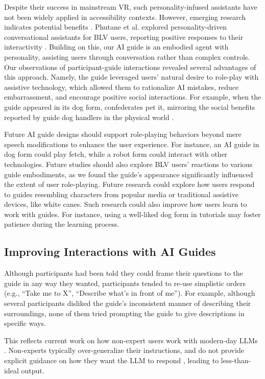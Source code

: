 Despite their success in mainstream VR, such personality-infused assistants have not been widely applied in accessibility contexts. However, emerging research indicates potential benefits \cite{phutane2023speaking}. Phutane et al. explored personality-driven conversational assistants for BLV users, reporting positive responses to their interactivity \cite{phutane2023speaking}. Building on this, our AI guide is an embodied agent with personality, assisting users through conversation rather than complex controls. Our observations of participant-guide interactions revealed several advantages of this approach. Namely, the guide leveraged users’ natural desire to role-play with assistive technology, which allowed them to rationalize AI mistakes, reduce embarrassment, and encourage positive social interactions. For example, when the guide appeared in its dog form, confederates pet it, mirroring the social benefits reported by guide dog handlers in the physical world \cite{hwang2024towards}.

Future AI guide designs should support role-playing behaviors beyond mere speech modifications to enhance the user experience. For instance, an AI guide in dog form could play fetch, while a robot form could interact with other technologies. Future studies should also explore BLV users' reactions to various guide embodiments, as we found the guide's appearance significantly influenced the extent of user role-playing. Future research could explore how users respond to guides resembling characters from popular media or traditional assistive devices, like white canes. Such research could also improve how users learn to work with guides. For instance, using a well-liked dog form in tutorials may foster patience during the learning process.

\subsection{Improving Interactions with AI Guides} \label{sec: Improving Interactions with AI Guides}

Although participants had been told they could frame their questions to the guide in any way they wanted, participants tended to re-use simplistic orders (e.g., “Take me to X”, “Describe what’s in front of me”). For example, although several participants disliked the guide’s inconsistent manner of describing their surroundings, none of them tried prompting the guide to give descriptions in specific ways.

This reflects current work on how non-expert users work with modern-day LLMs \cite{zamfirescu2023johnny, brachman2024knowledge, ha2024clochat}. Non-experts typically over-generalize their instructions, and do not provide explicit guidance on how they want the LLM to respond \cite{zamfirescu2023johnny}, leading to less-than-ideal output. 

